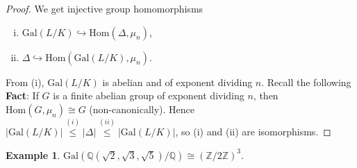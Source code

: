 \documentclass{article}
\theoremstyle{definition}
\newtheorem{example}{Example}[section]
\begin{document}
\begin{proof}
    We get injective group homomorphisms
    \begin{enumerate}[(i)]
        \item $\text{Gal}(L/K) \hookrightarrow \text{Hom}(\Delta,\mu_n)$,
        \item $\Delta \hookrightarrow \text{Hom}(\text{Gal}(L/K),\mu_n)$.
    \end{enumerate}
    From (i), $\text{Gal}(L/K)$ is abelian and of exponent dividing $n$. Recall the following \textbf{Fact}: If $G$ is a finite abelian group of exponent dividing $n$, then $\text{Hom}(G,\mu_n)\cong G$ (non-canonically). Hence $\left|\text{Gal}(L/K)\right|\stackrel{(i)}{\le } \left|\Delta\right| \stackrel{(ii)}{\le } \left|\text{Gal}(L/K)\right|$, so (i) and (ii) are isomorphisms.
\end{proof}
\begin{example}
    $\text{Gal}(\mathbb{Q}(\sqrt{2},\sqrt{3},\sqrt{5})/\mathbb{Q}) \cong (\mathbb{Z}/2\mathbb{Z})^3$.
\end{example}
\end{document}
